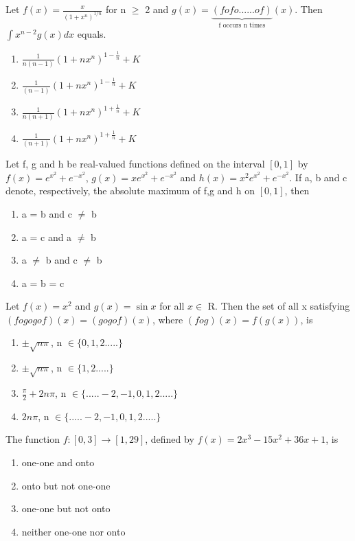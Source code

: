 \item Let $f(x)=\frac{x}{(1+x^n)^{1/n}}$ for n $\geq$ 2 and $g(x)=
\underbrace{(fofo......of)}_{\text{f occurs n times}}(x)$. Then $\int x^{n-2}g(x)dx$ equals.
\begin{enumerate}
\item $\frac{1}{n(n-1)}(1+nx^n)^{1-\frac{1}{n}}+K$
\item $\frac{1}{(n-1)}(1+nx^n)^{1-\frac{1}{n}}+K$
\item $\frac{1}{n(n+1)}(1+nx^n)^{1+\frac{1}{n}}+K$
\item $\frac{1}{(n+1)}(1+nx^n)^{1+\frac{1}{n}}+K$
\end{enumerate}

\item Let f, g and h be real-valued functions defined on the interval $[0,1]$ by $f(x)=e^{x{^2}}+e^{{-x}^2}$, $g(x)=xe^{x{^2}}+e^{{-x}^2}$ and $h(x)=x^2e^{x{^2}}+e^{{-x}^2}$. If a, b and c denote, respectively, the absolute maximum of f,g and h on $[0,1]$, then
\begin{enumerate}
\item a = b and c $\neq$ b
\item a = c and a $\neq$ b
\item a $\neq$ b and c $\neq$ b
\item a = b = c
\end{enumerate}

\item Let $f(x)=x^2$ and $g(x)=\sin x$ for all $x \in$ R. Then the set of all x satisfying $(fogogof)(x)=(gogof)(x)$, where $(fog)(x)=f(g(x))$, is
\begin{enumerate}
\item $\pm \sqrt{n\pi}$, n $\in \{0,1,2.....\}$
\item $\pm \sqrt{n\pi}$, n $\in \{1,2.....\}$
\item $\frac{\pi}{2}+2n\pi$, n $\in \{.....-2,-1,0,1,2.....\}$
\item $2n \pi$, n $\in \{.....-2,-1,0,1,2.....\}$
\end{enumerate}

\item The function $f:[0,3] \rightarrow [1,29]$, defined by $f(x)=2x^{3}-15x^{2}+36x+1$, is
\begin{enumerate}
\item one-one and onto
\item onto but not one-one
\item one-one but not onto
\item neither one-one nor onto
\end{enumerate}

